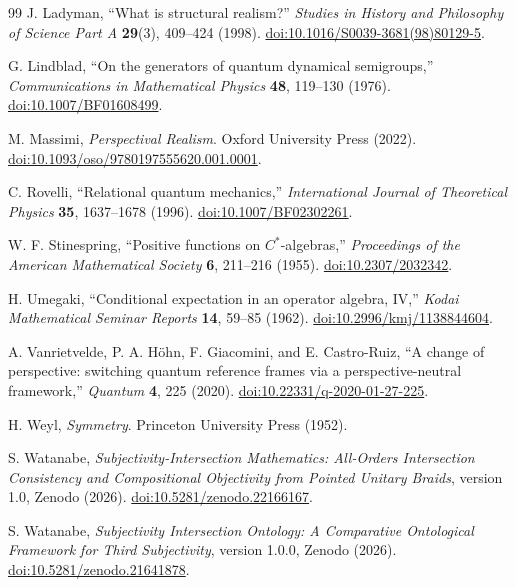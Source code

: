 \documentclass[11pt]{article}
\theoremstyle{definition}
\theoremstyle{remark}
\begin{document}
\begin{thebibliography}{99}
J. Ladyman, ``What is structural realism?'' \emph{Studies in History and Philosophy of Science Part A} \textbf{29}(3), 409--424 (1998). \href{https://doi.org/10.1016/S0039-3681(98)80129-5}{doi:10.1016/S0039-3681(98)80129-5}.

G. Lindblad, ``On the generators of quantum dynamical semigroups,'' \emph{Communications in Mathematical Physics} \textbf{48}, 119--130 (1976). \href{https://doi.org/10.1007/BF01608499}{doi:10.1007/BF01608499}.

M. Massimi, \emph{Perspectival Realism}. Oxford University Press (2022). \href{https://doi.org/10.1093/oso/9780197555620.001.0001}{doi:10.1093/oso/9780197555620.001.0001}.

C. Rovelli, ``Relational quantum mechanics,'' \emph{International Journal of Theoretical Physics} \textbf{35}, 1637--1678 (1996). \href{https://doi.org/10.1007/BF02302261}{doi:10.1007/BF02302261}.

W. F. Stinespring, ``Positive functions on $C^*$-algebras,'' \emph{Proceedings of the American Mathematical Society} \textbf{6}, 211--216 (1955). \href{https://doi.org/10.2307/2032342}{doi:10.2307/2032342}.

H. Umegaki, ``Conditional expectation in an operator algebra, IV,'' \emph{Kodai Mathematical Seminar Reports} \textbf{14}, 59--85 (1962). \href{https://doi.org/10.2996/kmj/1138844604}{doi:10.2996/kmj/1138844604}.

A. Vanrietvelde, P. A. H\"ohn, F. Giacomini, and E. Castro-Ruiz, ``A change of perspective: switching quantum reference frames via a perspective-neutral framework,'' \emph{Quantum} \textbf{4}, 225 (2020). \href{https://doi.org/10.22331/q-2020-01-27-225}{doi:10.22331/q-2020-01-27-225}.

H. Weyl, \emph{Symmetry}. Princeton University Press (1952).

S. Watanabe, \emph{Subjectivity-Intersection Mathematics: All-Orders Intersection Consistency and Compositional Objectivity from Pointed Unitary Braids}, version 1.0, Zenodo (2026). \href{https://doi.org/10.5281/zenodo.22166167}{doi:10.5281/zenodo.22166167}.

S. Watanabe, \emph{Subjectivity Intersection Ontology: A Comparative Ontological Framework for Third Subjectivity}, version 1.0.0, Zenodo (2026). \href{https://doi.org/10.5281/zenodo.21641878}{doi:10.5281/zenodo.21641878}.


\end{thebibliography}
\end{document}

